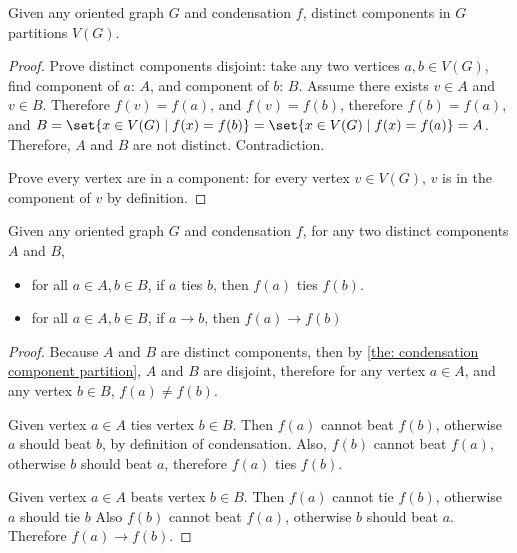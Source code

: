 \begin{theorem}\label{the: condensation component partition}
  Given any oriented graph \(G\) and condensation \(f\),
  distinct components in \(G\) partitions \(V(G)\).
\end{theorem}

\begin{proof}
  Prove distinct components disjoint:
  take any two vertices \(a, b \in V(G)\),
  find component of \(a\): \(A\),
  and component of \(b\): \(B\).
  Assume there exists \(v \in A\) and \(v \in B\).
  Therefore \(f(v) = f(a)\), and \(f(v) = f(b)\),
  therefore \(f(b) = f(a)\),
  and \(B
  = \set{x \in V(G) \mid f(x) = f(b)}
  = \set{x \in V(G) \mid f(x) = f(a)}
  = A\).
  Therefore, \(A\) and \(B\) are not distinct.
  Contradiction.

  Prove every vertex are in a component:
  for every vertex \(v \in V(G)\),
  \(v\) is in the component of \(v\) by definition.
\end{proof}

\begin{lemma}\label{the: vertex force image beating}
  Given any oriented graph \(G\) and condensation \(f\),
  for any two distinct components \(A\) and \(B\),
  \begin{itemize}
    \item
      for all \(a \in A, b \in B\), if \(a\) ties \(b\),
      then \(f(a)\) ties \(f(b)\).
    \item
      for all \(a \in A, b \in B\), if \(a \to b\),
      then \(f(a) \to f(b)\)
  \end{itemize}
\end{lemma}

\begin{proof}
  Because \(A\) and \(B\) are distinct components,
  then by \cref{the: condensation component partition},
  \(A\) and \(B\) are disjoint,
  therefore for any vertex \(a \in A\),
  and any vertex \(b \in B\), \(f(a) \neq f(b)\).

  Given vertex \(a \in A\) ties vertex \(b \in B\).
  Then \(f(a)\) cannot beat \(f(b)\),
  otherwise \(a\) should beat \(b\), by definition of condensation.
  Also, \(f(b)\) cannot beat \(f(a)\),
  otherwise \(b\) should beat \(a\),
  therefore \(f(a)\) ties \(f(b)\).

  Given vertex \(a \in A\) beats vertex \(b \in B\).
  Then \(f(a)\) cannot tie \(f(b)\),
  otherwise \(a\) should tie \(b\)
  Also \(f(b)\) cannot beat \(f(a)\),
  otherwise \(b\) should beat \(a\).
  Therefore \(f(a) \to f(b)\).
\end{proof}

